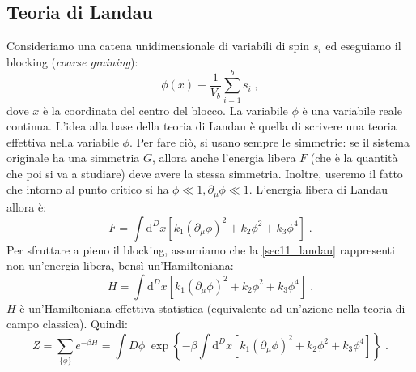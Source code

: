 \documentclass[12pt,a4paper]{article}
\theoremstyle{definition}
\numberwithin{equation}{section}
\newcommand{\diff}[1][]{\mathrm{d}#1}
\begin{document}
\subsection{Teoria di Landau}
Consideriamo una catena unidimensionale di variabili di spin $s_i$ ed eseguiamo il blocking (\emph{coarse graining}):
\begin{equation}
\phi(x)\equiv \frac{1}{V_b}\sum_{i=1}^bs_i\;,
\end{equation}
dove $x$ è la coordinata del centro del blocco. La variabile $\phi$ è una variabile reale continua. L'idea alla base della teoria di Landau è quella di scrivere una teoria effettiva nella variabile $\phi$. Per fare ciò, si usano sempre le simmetrie: se il sistema originale ha una simmetria $G$, allora anche l'energia libera $F$ (che è la quantità che poi si va a studiare) deve avere la stessa simmetria. Inoltre, useremo il fatto che intorno al punto critico si ha $\phi\ll 1,\partial_{\mu}\phi\ll 1$. L'energia libera di Landau allora è:
\begin{equation}
\boxed{
F=\int\diff^D{x}\left[k_1(\partial_{\mu}\phi)^2+k_2\phi^2+k_3\phi^4\right]
}\;. \label{sec11_landau}
\end{equation}
Per sfruttare a pieno il blocking, assumiamo che la \eqref{sec11_landau} rappresenti non un'energia libera, bensì un'Hamiltoniana:
\begin{equation}
H=\int\diff^D{x}\left[k_1(\partial_{\mu}\phi)^2+k_2\phi^2+k_3\phi^4\right]\;.
\end{equation}
$H$ è un'Hamiltoniana effettiva statistica (equivalente ad un'azione nella teoria di campo classica). Quindi:
\begin{equation}
Z=\sum_{\{\phi\}}e^{-\beta H}=\int D\phi\; \exp\left\{-\beta\int\diff^D{x}\left[k_1(\partial_{\mu}\phi)^2+k_2\phi^2+k_3\phi^4\right]\right\}\;.
\end{equation}
\end{document}
